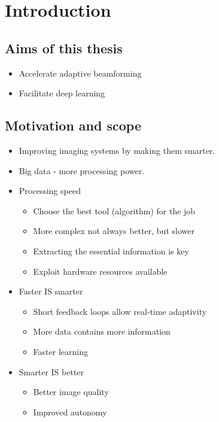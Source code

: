 \documentclass[thesis.tex]{subfiles}
\begin{document}
\chapter{Introduction}

\section{Aims of this thesis}

\begin{itemize}
\item Accelerate adaptive beamforming
\item Facilitate deep learning
\end{itemize}

\section{Motivation and scope}

%          
\begin{itemize}
\item Improving imaging systems by making them smarter.
\item Big data - more processing power.
\item Processing speed
\begin{itemize}
	\item Choose the best tool (algorithm) for the job
	\item More complex not always better, but slower
	\item Extracting the essential information is key 
	\item Exploit hardware resources available
\end{itemize}
\item Faster IS smarter
 \begin{itemize}
 	\item Short feedback loops allow real-time adaptivity
 	\item More data contains more information
 	\item Faster learning
 \end{itemize}
\item Smarter IS better
 \begin{itemize}
	\item Better image quality
	\item Improved autonomy
\end{itemize}
\end{itemize}
\end{document}
